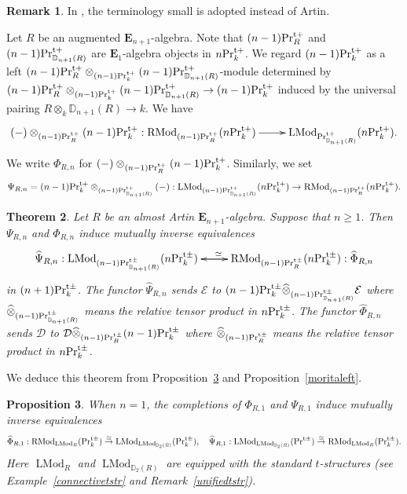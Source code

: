 \documentclass[leqno,12pt]{amsart}
\theoremstyle{plain}
\newtheorem{Theorem}{Theorem}[section]
\newtheorem{Proposition}[Theorem]{Proposition}
\theoremstyle{definition}
\newtheorem{Remark}[Theorem]{Remark}
\newcommand{\DD}{\mathbb{D}}
\newcommand{\EE}{\mathcal{E}}
\newcommand{\PRTT}{\textup{Pr}^{\textup{t}+}}
\newcommand{\PRTTT}{\textup{Pr}^{\textup{t}\pm}}
\newcommand{\eone}{\mathbf{E}_1}
\newcommand{\LMod}{\operatorname{LMod}}
\newcommand{\RMod}{\operatorname{RMod}}
\begin{document}
\begin{Remark}
In \cite{DAG}, the terminology small is adopted instead of Artin.
\end{Remark}








 
Let $R$ be an augmented  $\mathbf{E}_{n+1}$-algebra. Note that $(n-1)\PRTT_R$ and $(n-1)\PRTT_{\DD_{n+1}(R)}$
are $\eone$-algebra objects in $n\PRTT_k$.
We regard $(n-1)\PRTT_k$ as a left $(n-1)\PRTT_R\otimes_{(n-1)\PRTT_k} (n-1)\PRTT_{\DD_{n+1}(R)}$-module determined by
$(n-1)\PRTT_R\otimes_{(n-1)\PRTT_k} (n-1)\PRTT_{\DD_{n+1}(R)}\to (n-1)\PRTT_k$
induced by the universal pairing
$R\otimes_k\DD_{n+1}(R)\to k$. We have
\[
\xymatrix{
(-)\otimes_{(n-1)\PRTT_R}(n-1)\PRTT_k :\RMod_{(n-1)\PRTT_R}(n\PRTT_k) \ar[r] &  \LMod_{\PRTT_{\DD_{n+1}(R)}}(n\PRTT_k). 
}
\]
We write $\Phi_{R,n}$ for $(-)\otimes_{(n-1)\PRTT_R}(n-1)\PRTT_k$.
Similarly, we set 
\[
\Psi_{R,n}=(n-1)\PRTT_k\otimes_{(n-1)\PRTT_{\DD_{n+1}(R)}}(-):\LMod_{(n-1)\PRTT_{\DD_{n+1}(R)}}(n\PRTT_k)  \to \RMod_{(n-1)\PRTT_{R}}(n\PRTT_k).
\]



\begin{Theorem}
\label{HCKD}
Let  $R$ be an almost Artin $\mathbf{E}_{n+1}$-algebra.
Suppose that $n\ge1$. Then $\Psi_{R,n}$ and $\Phi_{R,n}$ induce mutually inverse equivalences 
\[
\xymatrix{
\widehat{\Psi}_{R,n}:\LMod_{(n-1)\PRTTT_{\DD_{n+1}(R)}}(n\PRTTT_k) \ar[r]^(0.55){\simeq} &  \RMod_{(n-1)\PRTTT_{R}}(n\PRTTT_k) : \widehat{\Phi}_{R,n} \ar[l]
}
\]
in $(n+1)\PRTTT_k$. The functor $\widehat{\Psi}_{R,n}$ sends $\mathcal{E}$ to $(n-1)\PRTTT_k\widehat{\otimes}_{(n-1)\PRTTT_{\DD_{n+1}(R)}}\EE$ where $\widehat{\otimes}_{(n-1)\PRTTT_{\DD_{n+1}(R)}}$
means the relative tensor product in $n\PRTTT_k$.  
The functor $\widehat{\Phi}_{R,n}$ sends $\mathcal{D}$ to $\mathcal{D}\widehat{\otimes}_{(n-1)\PRTTT_{R}}(n-1)\PRTTT_k$ where $\widehat{\otimes}_{(n-1)\PRTTT_{R}}$
means the relative tensor product in $n\PRTTT_k$.  
\end{Theorem}

We deduce this theorem from Proposition~\ref{caseone} and Proposition~\ref{moritaleft}.



\begin{Proposition}
\label{caseone}
When $n=1$, the completions of $\Phi_{R,1}$ and $\Psi_{R,1}$ induce mutually inverse equivalences
\[
\widehat{\Phi}_{R,1} :\RMod_{\LMod_R}(\PRTTT_k) \stackrel{\simeq}{\to}  \LMod_{\LMod_{\DD_{2}(R)}}(\PRTTT_k),\ \ \ \widehat{\Psi}_{R,1}:\LMod_{\LMod_{\DD_{2}(R)}}(\PRTTT)  \stackrel{\simeq}{\to} \RMod_{\LMod_{R}}(\PRTTT_k).
\]
Here $\LMod_R$ and $\LMod_{\DD_{2}(R)}$ are equipped with the standard $t$-structures (see Example~\ref{connectivetstr} and Remark~\ref{unifiedtstr}). 
\end{Proposition}
\end{document}
